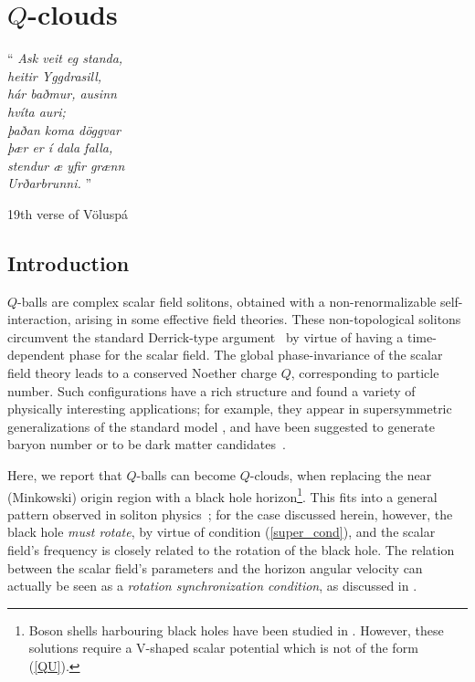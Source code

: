 \chapter{$Q$-clouds}
\label{ch:Q}

\epigraph{``\emph{
Ask veit eg standa, \\
heitir Yggdrasill, \\
hár baðmur, ausinn \\
hvíta auri; \\
þaðan koma döggvar \\
þær er í dala falla, \\
stendur æ yfir grænn \\
Urðarbrunni. 
} 
''}{19th verse of Völuspá}
\section{Introduction}

$Q$-balls are complex scalar field solitons, obtained with a non-renormalizable self-interaction, arising in some effective field theories. 
These non-topological solitons circumvent the standard Derrick-type argument~\cite{Derrick:1964ww} by virtue of having a
time-dependent phase for the scalar field.
The global phase-invariance of the scalar field theory leads to a conserved Noether
charge $Q$, corresponding to particle number.
Such configurations have a rich structure and
found a variety
of physically interesting applications;
for example, they appear in supersymmetric generalizations of the standard model \cite{Kusenko:1997zq}, 
and have been suggested to generate baryon number or to be dark matter candidates~\cite{Kusenko:1997si}.

\bigskip

Here, we report that $Q$-balls can become $Q$-clouds, when replacing the near (Minkowski) origin region with a black hole horizon\footnote{
Boson shells harbouring black holes have been studied in \cite{Kleihaus:2010ep}.
However, these solutions require a V-shaped scalar potential which
is not of the form (\ref{QU}).}.
This fits into a general pattern observed in soliton physics~\cite{Bizon:1994dh,Volkov:1998cc,Herdeiro:2014ima}; for the case discussed herein, however, the black hole \textit{must rotate}, by virtue of condition (\ref{super_cond}), and the scalar field's frequency is closely related to the rotation of the black hole.
The relation between the scalar field's parameters and the horizon angular velocity can actually be seen as a \textit {rotation synchronization condition}, as discussed in \cite{Benone:2014ssa}. 
%
%
